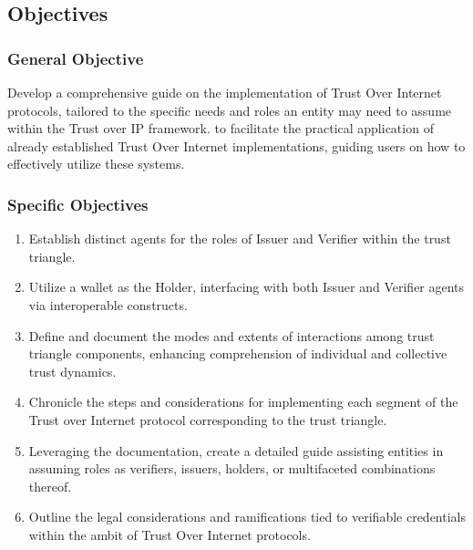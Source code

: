 \subsection{Objectives}

\subsubsection{General Objective}

Develop a comprehensive guide on the implementation of Trust Over Internet protocols, tailored to the specific needs and roles an entity may need to assume within the Trust over IP framework. to facilitate the practical application of already established Trust Over Internet implementations, guiding users on how to effectively utilize these systems.

\subsubsection{Specific Objectives}

\begin{enumerate}
    \item Establish distinct agents for the roles of Issuer and Verifier within the trust triangle.
    \item Utilize a wallet as the Holder, interfacing with both Issuer and Verifier agents via interoperable constructs.
    \item Define and document the modes and extents of interactions among trust triangle components, enhancing comprehension of individual and collective trust dynamics.
    \item Chronicle the steps and considerations for implementing each segment of the Trust over Internet protocol corresponding to the trust triangle.
    \item Leveraging the documentation, create a detailed guide assisting entities in assuming roles as verifiers, issuers, holders, or multifaceted combinations thereof.
    \item Outline the legal considerations and ramifications tied to verifiable credentials within the ambit of Trust Over Internet protocols.
\end{enumerate}
